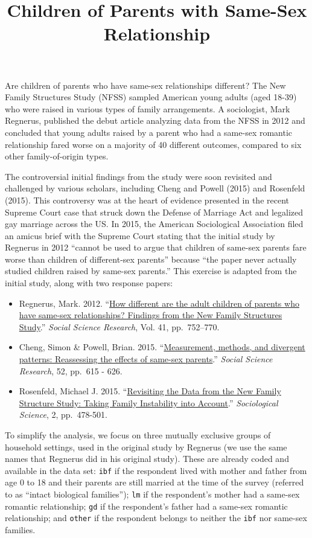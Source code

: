 \documentclass[]{article}
\title{Children of Parents with Same-Sex Relationship}
\author{}
\date{}
\begin{document}
\maketitle


Are children of parents who have same-sex relationships different? The
New Family Structures Study (NFSS) sampled American young adults (aged
18-39) who were raised in various types of family arrangements. A
sociologist, Mark Regnerus, published the debut article analyzing data
from the NFSS in 2012 and concluded that young adults raised by a parent
who had a same-sex romantic relationship fared worse on a majority of 40
different outcomes, compared to six other family-of-origin types.

The controversial initial findings from the study were soon revisited
and challenged by various scholars, including Cheng and Powell (2015)
and Rosenfeld (2015). This controversy was at the heart of evidence
presented in the recent Supreme Court case that struck down the Defense
of Marriage Act and legalized gay marriage across the US. In 2015, the
American Sociological Association filed an amicus brief with the Supreme
Court stating that the initial study by Regnerus in 2012 ``cannot be
used to argue that children of same-sex parents fare worse than children
of different-sex parents'' because ``the paper never actually studied
children raised by same-sex parents.'' This exercise is adapted from the
initial study, along with two response papers:

\begin{itemize}
\item
  Regnerus, Mark. 2012.
  ``\href{http://dx.doi.org/10.1016/j.ssresearch.2012.03.009}{How
  different are the adult children of parents who have same-sex
  relationships? Findings from the New Family Structures Study}.''
  \emph{Social Science Research}, Vol. 41, pp.~752--770.
\item
  Cheng, Simon \& Powell, Brian. 2015.
  ``\href{http://dx.doi.org/10.1016/j.ssresearch.2015.04.005}{Measurement,
  methods, and divergent patterns: Reassessing the effects of same-sex
  parents}.'' \emph{Social Science Research}, 52, pp.~615 - 626.
\item
  Rosenfeld, Michael J. 2015.
  ``\href{http://dx.doi.org/10.15195/v2.a23}{Revisiting the Data from
  the New Family Structure Study: Taking Family Instability into
  Account}.'' \emph{Sociological Science}, 2, pp.~478-501.
\end{itemize}

To simplify the analysis, we focus on three mutually exclusive groups of
household settings, used in the original study by Regnerus (we use the
same names that Regnerus did in his original study). These are already
coded and available in the data set: \texttt{ibf} if the respondent
lived with mother and father from age 0 to 18 and their parents are
still married at the time of the survey (referred to as ``intact
biological families''); \texttt{lm} if the respondent's mother had a
same-sex romantic relationship; \texttt{gd} if the respondent's father
had a same-sex romantic relationship; and \texttt{other} if the
respondent belongs to neither the \texttt{ibf} nor same-sex families.
\end{document}
